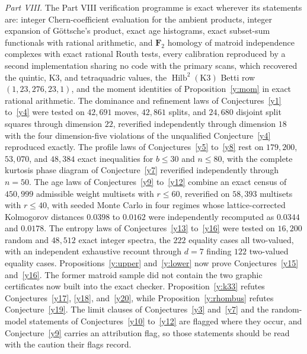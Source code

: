 \documentclass[11pt]{article}
\theoremstyle{definition}
\begin{document}
\emph{Part VIII.}  The Part VIII verification programme is exact wherever its statements are: integer Chern-coefficient evaluation for the ambient products, integer expansion of G\"ottsche's product, exact age histograms, exact subset-sum functionals with rational arithmetic, and $\mathbf F_2$ homology of matroid independence complexes with exact rational Routh tests, every calibration reproduced by a second implementation sharing no code with the primary scans, which recovered the quintic, K3, and tetraquadric values, the $\operatorname{Hilb}^2(\mathrm{K3})$ Betti row $(1,23,276,23,1)$, and the moment identities of Proposition~\ref{y:mom} in exact rational arithmetic.  The dominance and refinement laws of Conjectures~\ref{y1} to~\ref{y4} were tested on $42{,}691$ moves, $42{,}861$ splits, and $24{,}680$ disjoint split squares through dimension $22$, reverified independently through dimension $18$ with the four dimension-five violations of the unqualified Conjecture~\ref{y4} reproduced exactly.  The profile laws of Conjectures~\ref{y5} to~\ref{y8} rest on $179{,}200$, $53{,}070$, and $48{,}384$ exact inequalities for $b\le30$ and $n\le80$, with the complete kurtosis phase diagram of Conjecture~\ref{y7} reverified independently through $n=50$.  The age laws of Conjectures~\ref{y9} to~\ref{y12} combine an exact census of $450{,}999$ admissible weight multisets with $r\le60$, reverified on $58{,}393$ multisets with $r\le40$, with seeded Monte Carlo in four regimes whose lattice-corrected Kolmogorov distances $0.0398$ to $0.0162$ were independently recomputed as $0.0344$ and $0.0178$.  The entropy laws of Conjectures~\ref{y13} to~\ref{y16} were tested on $16{,}200$ random and $48{,}512$ exact integer spectra, the $222$ equality cases all two-valued, with an independent exhaustive recount through $d=7$ finding $122$ two-valued equality cases.  Propositions~\ref{y:upper} and~\ref{y:lower} now prove Conjectures~\ref{y15} and~\ref{y16}.  The former matroid sample did not contain the two graphic certificates now built into the exact checker.  Proposition~\ref{y:k33} refutes Conjectures~\ref{y17}, \ref{y18}, and~\ref{y20}, while Proposition~\ref{y:rhombus} refutes Conjecture~\ref{y19}.  The limit clauses of Conjectures~\ref{y3} and~\ref{y7} and the random-model statements of Conjectures~\ref{y10} to~\ref{y12} are flagged where they occur, and Conjecture~\ref{y9} carries an attribution flag, so those statements should be read with the caution their flags record.
\end{document}
